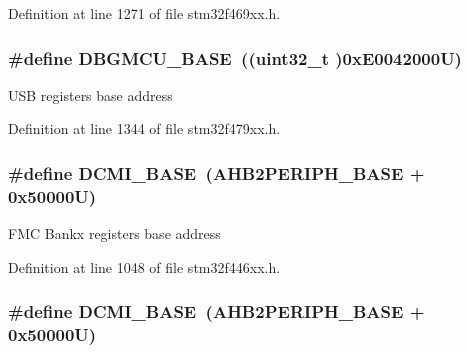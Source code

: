 Definition at line 1271 of file stm32f469xx.\+h.

\subsubsection[{\texorpdfstring{D\+B\+G\+M\+C\+U\+\_\+\+B\+A\+SE}{DBGMCU_BASE}}]{\setlength{\rightskip}{0pt plus 5cm}\#define D\+B\+G\+M\+C\+U\+\_\+\+B\+A\+SE~((uint32\+\_\+t )0x\+E0042000\+U)}\hypertarget{group___peripheral__memory__map_ga4adaf4fd82ccc3a538f1f27a70cdbbef}{}\label{group___peripheral__memory__map_ga4adaf4fd82ccc3a538f1f27a70cdbbef}
U\+SB registers base address 

Definition at line 1344 of file stm32f479xx.\+h.

\subsubsection[{\texorpdfstring{D\+C\+M\+I\+\_\+\+B\+A\+SE}{DCMI_BASE}}]{\setlength{\rightskip}{0pt plus 5cm}\#define D\+C\+M\+I\+\_\+\+B\+A\+SE~({\bf A\+H\+B2\+P\+E\+R\+I\+P\+H\+\_\+\+B\+A\+SE} + 0x50000\+U)}\hypertarget{group___peripheral__memory__map_ga55b794507e021135486de57129a2505c}{}\label{group___peripheral__memory__map_ga55b794507e021135486de57129a2505c}
F\+MC Bankx registers base address 

Definition at line 1048 of file stm32f446xx.\+h.

\subsubsection[{\texorpdfstring{D\+C\+M\+I\+\_\+\+B\+A\+SE}{DCMI_BASE}}]{\setlength{\rightskip}{0pt plus 5cm}\#define D\+C\+M\+I\+\_\+\+B\+A\+SE~({\bf A\+H\+B2\+P\+E\+R\+I\+P\+H\+\_\+\+B\+A\+SE} + 0x50000\+U)}\hypertarget{group___peripheral__memory__map_ga55b794507e021135486de57129a2505c}{}\label{group___peripheral__memory__map_ga55b794507e021135486de57129a2505c}


